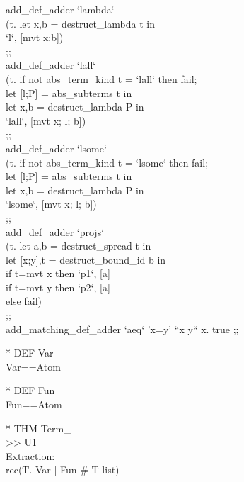 \begin{prl*}
\>  add\_def\_adder `lambda`\\
\>    (\mbackslash{}t.  let x,b = destruct\_lambda t in\\
\>          `l`, [mvt x;b])\\
\>  ;;\\
\>  add\_def\_adder `lall`\\
\>    (\mbackslash{}t. if not abs\_term\_kind t = `lall` then fail;\\
\>         let [l;P] = abs\_subterms t in\\
\>         let x,b = destruct\_lambda P in\\
\>         `lall`, [mvt x; l; b])\\
\>  ;;\\
\>  add\_def\_adder `lsome`\\
\>    (\mbackslash{}t. if not abs\_term\_kind t = `lsome` then fail;\\
\>         let [l;P] = abs\_subterms t in\\
\>         let x,b = destruct\_lambda P in\\
\>         `lsome`, [mvt x; l; b])\\
\>  ;;\\
\>  add\_def\_adder `projs`\\
\>    (\mbackslash{}t. let a,b = destruct\_spread t in\\
\>         let [x;y],t = destruct\_bound\_id b in\\
\>         if t=mvt x then `p1`, [a] \\
\>         if t=mvt y then `p2`, [a]\\
\>         else fail)\\
\>  ;;\\
\>  add\_matching\_def\_adder `aeq` 'x=y' ``x y`` \mlambda{}x. true ;;
\end{prl*}

\begin{prl*}
\>* DEF Var\\
\>  Var==Atom
\end{prl*}

\begin{prl*}
\>* DEF Fun\\
\>  Fun==Atom
\end{prl*}

\begin{prl*}
\>* THM Term\_\\
\>  >> U1\\
\>  Extraction:\\
\>  rec(T. Var | Fun \# T list)
\end{prl*}

